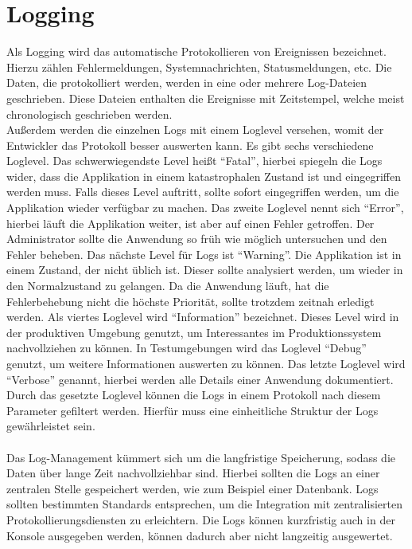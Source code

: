 \section{Logging}\label{sec:logging}
Als Logging wird das automatische Protokollieren von Ereignissen bezeichnet.
Hierzu zählen Fehlermeldungen, Systemnachrichten, Statusmeldungen, etc.
Die Daten, die protokolliert werden, werden in eine oder mehrere Log-Dateien geschrieben.
Diese Dateien enthalten die Ereignisse mit Zeitstempel, welche meist chronologisch geschrieben werden.
\\
Außerdem werden die einzelnen Logs mit einem Loglevel versehen, womit der Entwickler das Protokoll besser auswerten kann.
Es gibt sechs verschiedene Loglevel.
Das schwerwiegendste Level heißt \enquote{Fatal}, hierbei spiegeln die Logs wider, dass die Applikation in einem katastrophalen Zustand ist und eingegriffen werden muss.
Falls dieses Level auftritt, sollte sofort eingegriffen werden, um die Applikation wieder verfügbar zu machen.
Das zweite Loglevel nennt sich \enquote{Error}, hierbei läuft die Applikation weiter, ist aber auf einen Fehler getroffen.
Der Administrator sollte die Anwendung so früh wie möglich untersuchen und den Fehler beheben.
Das nächste Level für Logs ist \enquote{Warning}.
Die Applikation ist in einem Zustand, der nicht üblich ist.
Dieser sollte analysiert werden, um wieder in den Normalzustand zu gelangen.
Da die Anwendung läuft, hat die Fehlerbehebung nicht die höchste Priorität, sollte trotzdem zeitnah erledigt werden.
Als viertes Loglevel wird \enquote{Information} bezeichnet.
Dieses Level wird in der produktiven Umgebung genutzt, um Interessantes im Produktionssystem nachvollziehen zu können.
In Testumgebungen wird das Loglevel \enquote{Debug} genutzt, um weitere Informationen auswerten zu können.
Das letzte Loglevel wird \enquote{Verbose} genannt, hierbei werden alle Details einer Anwendung dokumentiert.
Durch das gesetzte Loglevel können die Logs in einem Protokoll nach diesem Parameter gefiltert werden.
Hierfür muss eine einheitliche Struktur der Logs gewährleistet sein.
\\
\\
Das Log-Management kümmert sich um die langfristige Speicherung, sodass die Daten über lange Zeit nachvollziehbar sind.
Hierbei sollten die Logs an einer zentralen Stelle gespeichert werden, wie zum Beispiel einer Datenbank.
Logs sollten bestimmten Standards entsprechen, um die Integration mit zentralisierten Protokollierungsdiensten zu erleichtern.
Die Logs können kurzfristig auch in der Konsole ausgegeben werden, können dadurch aber nicht langzeitig ausgewertet.
